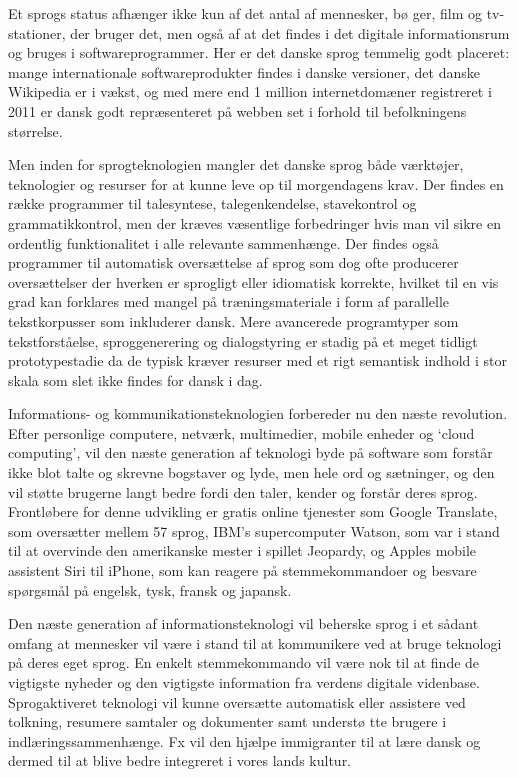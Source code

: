 \begin{multicols}{2}
Et sprogs status afh\ae nger ikke kun af det antal af mennesker, b\o
ger, film og tv-stationer, der bruger det, men \mbox{ogs\aa} af at det
findes i det digitale informationsrum og bruges i softwareprogrammer.
Her er det danske sprog temmelig godt placeret: mange internationale
softwareprodukter findes i danske versioner, det danske Wikipedia er i
v\ae kst, og med mere end 1 million internetdom\ae ner registreret i
2011 er dansk godt repr\ae senteret \mbox{p\aa} webben set i forhold
til befolkningens st\o rrelse.

Men inden for sprogteknologien mangler det danske sprog b\aa de
v\ae rkt\o jer, teknologier og resurser for at kunne leve op til
morgendagens krav. Der findes en r\ae kke programmer til talesyntese,
talegenkendelse, stavekontrol og grammatikkontrol, men der kr\ae ves
v\ae sentlige forbedringer hvis man vil sikre en ordentlig funktionalitet
i alle relevante sammenh\ae nge. Der findes \mbox{ogs\aa} programmer til
automatisk overs\ae ttelse af sprog som dog ofte producerer overs\ae ttelser
der hverken er sprogligt eller idiomatisk korrekte, hvilket til en vis
grad kan forklares med mangel \mbox{p\aa} tr\ae ningsmateriale i form af
parallelle tekstkorpusser som inkluderer dansk. Mere avancerede
programtyper som tekstforst\aa else, sproggenerering og dialogstyring er
stadig \mbox{p\aa} et meget tidligt prototypestadie da de typisk kr\ae ver
resurser med et rigt semantisk indhold i stor skala som slet ikke
findes for dansk i dag.

Informations- og kommunikationsteknologien forbereder nu den n\ae ste
revolution. Efter personlige computere, netv\ae rk, multimedier,
mobile enheder og `cloud computing', vil den n\ae ste generation af
teknologi byde \mbox{p\aa} software som forst\aa r ikke blot talte og
skrevne bogstaver og lyde, men hele ord og s\ae tninger, og den vil
st\o tte brugerne langt bedre fordi den taler, kender og forst\aa r
deres sprog. Frontl\o bere for denne udvikling er gratis online
tjenester som Google Translate, som overs\ae tter mellem 57 sprog,
IBM's supercomputer Watson, som var i stand til at overvinde den
amerikanske mester i spillet Jeopardy, og Apples mobile assistent Siri
til \mbox{iPhone}, som kan reagere \mbox{p\aa} stemmekommandoer og besvare
sp\o rgsm\aa l \mbox{p\aa} engelsk, tysk, fransk og japansk.

Den n\ae ste generation af informationsteknologi vil beherske sprog i
et s\aa dant omfang at mennesker vil v\ae re i stand til at
kommunikere ved at bruge teknologi \mbox{p\aa} deres eget sprog.  En
enkelt stemmekommando vil v\ae re nok til at finde de vigtigste
nyheder og den vigtigste information fra verdens digitale videnbase.
Sprogaktiveret teknologi vil kunne overs\ae tte automatisk eller
assistere ved tolkning, resumere samtaler og dokumenter samt underst\o
tte brugere i indl\ae ringssammenh\ae nge. Fx vil den hj\ae lpe
immigranter til at l\ae re dansk og dermed til at blive bedre
integreret i vores lands kultur.


\end{multicols}
